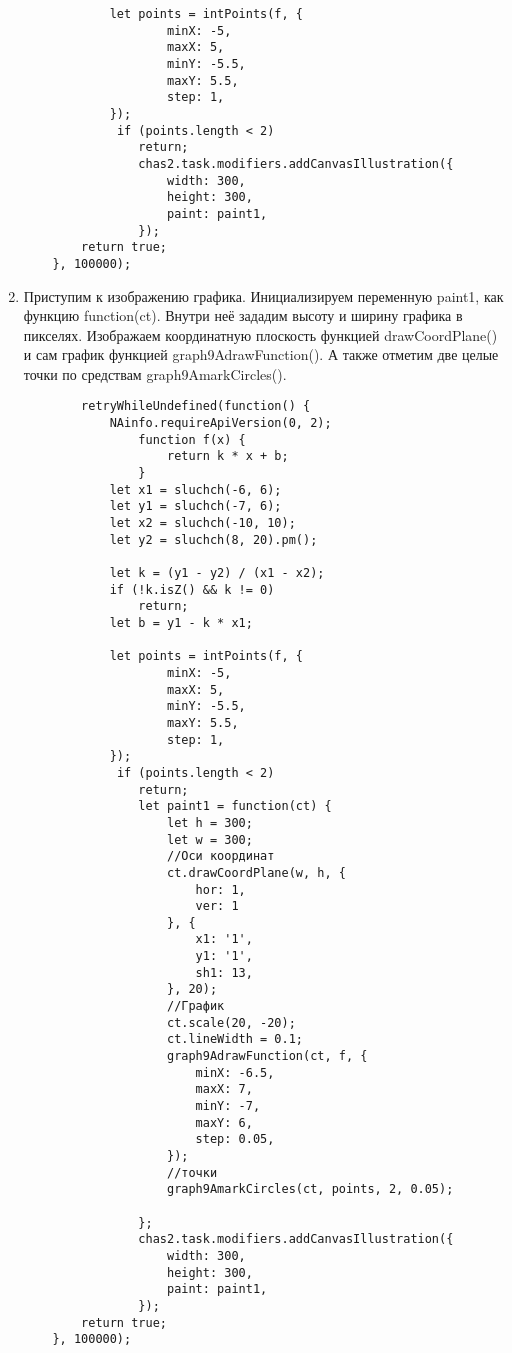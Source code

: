 \begin{enumerate}
\begin{verbatim}
            let points = intPoints(f, {
		            minX: -5,
		            maxX: 5,
		            minY: -5.5,
		            maxY: 5.5,
		            step: 1,
	        });
	         if (points.length < 2)
		        return;
                chas2.task.modifiers.addCanvasIllustration({
                    width: 300,
                    height: 300,
                    paint: paint1,
                });
        return true;
    }, 100000);
        \end{verbatim}
    \item Приступим к изображению графика. Инициализируем переменную paint1, как функцию function(ct). Внутри неё зададим высоту и ширину графика в пикселях.
          Изображаем координатную плоскость функцией drawCoordPlane() и сам график функцией graph9AdrawFunction(). А также отметим две целые точки по средствам graph9AmarkCircles().
          \begin{verbatim}
        retryWhileUndefined(function() {
            NAinfo.requireApiVersion(0, 2);
                function f(x) {
                    return k * x + b;
                }
            let x1 = sluchch(-6, 6);
            let y1 = sluchch(-7, 6);
            let x2 = sluchch(-10, 10);
            let y2 = sluchch(8, 20).pm();
    
            let k = (y1 - y2) / (x1 - x2);
            if (!k.isZ() && k != 0)
                return;
            let b = y1 - k * x1;

            let points = intPoints(f, {
		            minX: -5,
		            maxX: 5,
		            minY: -5.5,
		            maxY: 5.5,
		            step: 1,
	        });
	         if (points.length < 2)
		        return;
                let paint1 = function(ct) {
                    let h = 300;
                    let w = 300;
                    //Оси координат
                    ct.drawCoordPlane(w, h, {
                        hor: 1,
                        ver: 1
                    }, {
                        x1: '1',
                        y1: '1',
                        sh1: 13,
                    }, 20);
                    //График
                    ct.scale(20, -20);
                    ct.lineWidth = 0.1;
                    graph9AdrawFunction(ct, f, {
                        minX: -6.5,
                        maxX: 7,
                        minY: -7,
                        maxY: 6,
                        step: 0.05,
                    });
                    //точки
                    graph9AmarkCircles(ct, points, 2, 0.05);

                };
                chas2.task.modifiers.addCanvasIllustration({
                    width: 300,
                    height: 300,
                    paint: paint1,
                });
        return true;
    }, 100000);
        \end{verbatim}
\end{enumerate}
